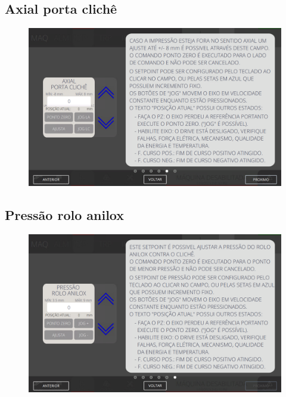 \newpage
\thispagestyle{fancy}
\vspace*{\fill}
\subsection{Axial porta clichê}
\vspace*{\fill}
\begin{figure}[h]
    \centering
    \includegraphics[width=576 px,height=360 px]{src/imagesICV/04-printters/02-printter/settings/e-5.png}
\end{figure}
\vspace*{\fill}

\newpage
\thispagestyle{fancy}
\vspace*{\fill}
\subsection{Pressão rolo anilox}
\vspace*{\fill}
\begin{figure}[h]
    \centering
    \includegraphics[width=576 px,height=360 px]{src/imagesICV/04-printters/02-printter/settings/e-6.png}
\end{figure}
\vspace*{\fill}
